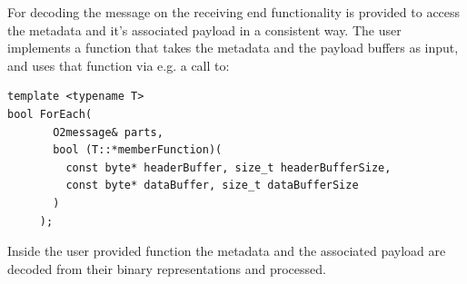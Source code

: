 \documentclass[a4paper,twoside]{article}
\begin{document}
For decoding the message on the receiving end functionality is provided to access the metadata and it's associated payload in a consistent way. The user implements a function that takes the metadata and the payload buffers as input, and uses that function via e.g. a call to:
\begin{lstlisting}
template <typename T>
bool ForEach(
       O2message& parts,
       bool (T::*memberFunction)(
         const byte* headerBuffer, size_t headerBufferSize,
         const byte* dataBuffer, size_t dataBufferSize
       )
     );
\end{lstlisting}
Inside the user provided function the metadata and the associated payload are decoded from their binary representations and processed.

\printbibliography
\end{document}
